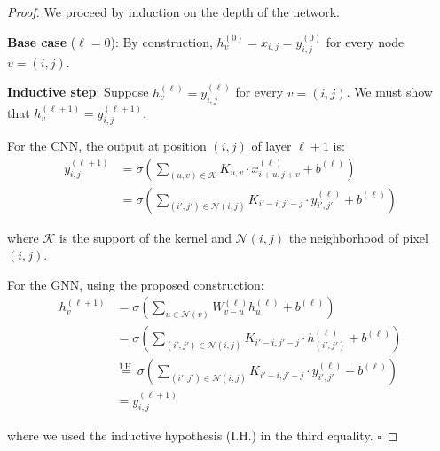 \begin{proof}
We proceed by induction on the depth of the network.

\textbf{Base case} ($\ell = 0$): By construction, $h_v^{(0)} = x_{i,j} = y_{i,j}^{(0)}$ for every node $v = (i,j)$.

\textbf{Inductive step}: Suppose $h_v^{(\ell)} = y_{i,j}^{(\ell)}$ for every $v = (i,j)$. We must show that $h_v^{(\ell+1)} = y_{i,j}^{(\ell+1)}$.

For the CNN, the output at position $(i,j)$ of layer $\ell+1$ is:
\begin{align}
y_{i,j}^{(\ell+1)} &= \sigma\left(\sum_{(u,v) \in \mathcal{K}} K_{u,v} \cdot x_{i+u,j+v}^{(\ell)} + b^{(\ell)}\right) \\
&= \sigma\left(\sum_{(i',j') \in \mathcal{N}(i,j)} K_{i'-i,j'-j} \cdot y_{i',j'}^{(\ell)} + b^{(\ell)}\right)
\end{align}

where $\mathcal{K}$ is the support of the kernel and $\mathcal{N}(i,j)$ the neighborhood of pixel $(i,j)$.

For the GNN, using the proposed construction:
\begin{align}
h_v^{(\ell+1)} &= \sigma\left(\sum_{u \in \mathcal{N}(v)} W_{v-u}^{(\ell)} h_u^{(\ell)} + b^{(\ell)}\right) \\
&= \sigma\left(\sum_{(i',j') \in \mathcal{N}(i,j)} K_{i'-i,j'-j} \cdot h_{(i',j')}^{(\ell)} + b^{(\ell)}\right) \\
&\overset{\text{I.H.}}{=} \sigma\left(\sum_{(i',j') \in \mathcal{N}(i,j)} K_{i'-i,j'-j} \cdot y_{i',j'}^{(\ell)} + b^{(\ell)}\right) \\
&= y_{i,j}^{(\ell+1)}
\end{align}

where we used the inductive hypothesis (I.H.) in the third equality. $\square$
\end{proof}

